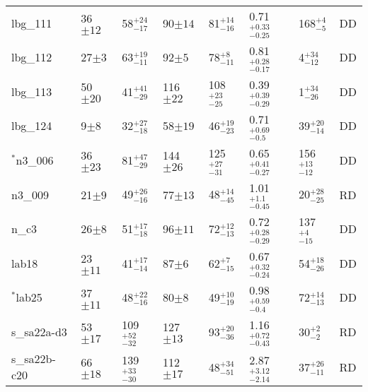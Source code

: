 \documentclass[fleqn,usenatbib]{mnras}
\begin{document}
\begin{table*}
\begin{threeparttable}
\begin{tabular}{llllllll}
lbg\_111        & 36$\pm12$         & 58$^{+24}_{-17}$                     & 90$\pm14$                  & 81$^{+14}_{-16}$                   & 0.71$^{+0.33}_{-0.25}$                 & 168$^{+4}_{-5}$ & DD  \\[1ex]
lbg\_112         & 27$\pm3$                    & 63$^{+19}_{-11}$                    & 92$\pm5$                 & 78$^{+8}_{-11}$       & 0.81$^{+0.28}_{-0.17}$               & 4$^{+34}_{-12}$ & DD \\[1ex]
lbg\_113        & 50$\pm20$           & 41$^{+41}_{-29}$                     & 116$\pm22$                 & 108$^{+23}_{-25}$                  & 0.39$^{+0.39}_{-0.29}$                & 1$^{+34}_{-26}$  & DD   \\[1ex]
lbg\_124         & 9$\pm8$                    & 32$^{+27}_{-18}$                    & 58$\pm19$                 & 46$^{+19}_{-23}$       & 0.71$^{+0.69}_{-0.5}$               & 39$^{+20}_{-14}$ & DD \\[1ex]
$^{*}$n3\_006         & 36$\pm23$                    & 81$^{+47}_{-29}$                     & 144$\pm26$                 & 125$^{+27}_{-31}$          & 0.65$^{+0.41}_{-0.27}$                & 156$^{+13}_{-12}$ & DD   \\[1ex]
n3\_009         & 21$\pm9$                    & 49$^{+26}_{-16}$                     & 77$\pm13$                  & 48$^{+14}_{-45}$          & 1.01$^{+1.1}_{-0.45}$                & 20$^{+28}_{-25}$  & RD   \\[1ex]
n\_c3           & 26$\pm8$                    & 51$^{+17}_{-18}$                     & 96$\pm11$                  & 72$^{+12}_{-13}$          & 0.72$^{+0.28}_{-0.29}$                & 137$^{+4}_{-15}$  & DD  \\[1ex]
lab18           & 23$\pm11$                   & 41$^{+17}_{-14}$                     & 87$\pm6$                  & 62$^{+7}_{-15}$           & 0.67$^{+0.32}_{-0.24}$                 & 54$^{+18}_{-26}$ & DD    \\[1ex]
$^{*}$lab25           & 37$\pm11$                    & 48$^{+22}_{-16}$                     & 80$\pm8$                  & 49$^{+10}_{-19}$          & 0.98$^{+0.59}_{-0.4}$                & 72$^{+14}_{-13}$ & DD   \\[1ex]
s\_sa22a-d3     & 53$\pm17$                    & 109$^{+52}_{-32}$                    & 127$\pm13$                 & 93$^{+20}_{-36}$          & 1.16$^{+0.72}_{-0.43}$               & 30$^{+2}_{-2}$ & RD    \\[1ex]
s\_sa22b-c20    & 66$\pm18$                    & 139$^{+33}_{-30}$                    & 112$\pm17$                 & 48$^{+34}_{-51}$          & 2.87$^{+3.12}_{-2.14}$                & 37$^{+26}_{-11}$ & RD   \\[1ex]

\end{tabular}
\end{threeparttable}
\end{table*}
\end{document}
